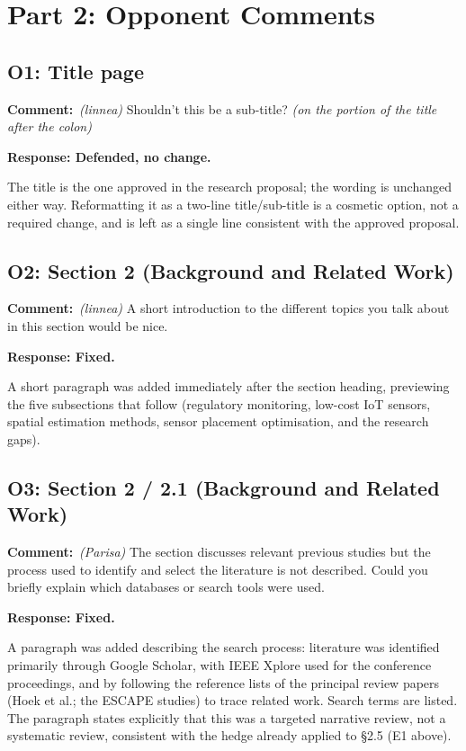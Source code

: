 \documentclass[11pt,a4paper]{article}
\newcommand{\rjcomment}[1]{\par\noindent\textbf{Comment:}\ #1\par}
\newcommand{\rjresponse}[1]{\par\noindent\textbf{Response: #1}\par}
\begin{document}
\section{Part 2: Opponent Comments}

\subsection{O1: Title page}

\rjcomment{\emph{(linnea)} Shouldn't this be a sub-title? \emph{(on the portion of the title
after the colon)}}

\rjresponse{Defended, no change.}
The title is the one approved in the research proposal; the wording is unchanged either way.
Reformatting it as a two-line title/sub-title is a cosmetic option, not a required change, and is
left as a single line consistent with the approved proposal.

\subsection{O2: Section 2 (Background and Related Work)}

\rjcomment{\emph{(linnea)} A short introduction to the different topics you talk about in this
section would be nice.}

\rjresponse{Fixed.}
A short paragraph was added immediately after the section heading, previewing the five
subsections that follow (regulatory monitoring, low-cost IoT sensors, spatial estimation
methods, sensor placement optimisation, and the research gaps).

\subsection{O3: Section 2 / 2.1 (Background and Related Work)}

\rjcomment{\emph{(Parisa)} The section discusses relevant previous studies but the process used to
identify and select the literature is not described. Could you briefly explain which databases or
search tools were used.}

\rjresponse{Fixed.}
A paragraph was added describing the search process: literature was identified primarily through
Google Scholar, with IEEE Xplore used for the conference proceedings, and by following the
reference lists of the principal review papers (Hoek et al.; the ESCAPE studies) to trace
related work. Search terms are listed. The paragraph states explicitly that this was a targeted
narrative review, not a systematic review, consistent with the hedge already applied to \S2.5
(E1 above).
\end{document}

